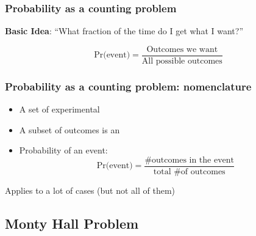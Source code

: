 \documentclass{beamer}
\begin{document}
\begin{frame}
  \frametitle{Probability as a counting problem}

  {\larger
    {\bf Basic Idea}: ``What fraction of the time do I get what I want?''

    \bigskip
    
    \begin{equation*}
      \text{Pr(event)} = \frac{\text{Outcomes we want}}{\text{All possible outcomes}}
    \end{equation*}
  }
\end{frame}

\begin{frame}
  \frametitle{Probability as a counting problem: nomenclature}

  {\larger
    \begin{itemize}
    \item A set of experimental {\bf {}}
      \bigskip
      
    \item A subset of outcomes is an {\bf {}}
      \bigskip

    \item Probability of an event:\\
      \begin{equation*}
        \text{Pr(event)} = \frac{\text{\# outcomes in the
            event}}{\text{total \# of outcomes}}
      \end{equation*}
      
    \end{itemize}

    \vfill

    Applies to a lot of cases (but not all of them)
  }  
\end{frame}

\subsection{Monty Hall Problem}
\end{document}
